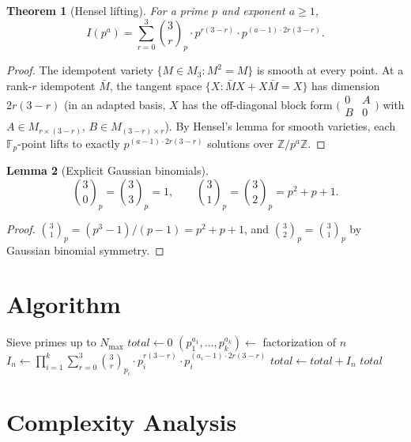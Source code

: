 \documentclass[12pt]{article}
\newtheorem{theorem}{Theorem}
\newtheorem{lemma}[theorem]{Lemma}
\begin{document}
\begin{theorem}[Hensel lifting]
For a prime $p$ and exponent $a \geq 1$,
\[
I(p^a) = \sum_{r=0}^{3} \binom{3}{r}_{\!p} \cdot p^{r(3-r)} \cdot p^{(a-1) \cdot 2r(3-r)}.
\]
\end{theorem}

\begin{proof}
The idempotent variety $\{M \in M_3 : M^2 = M\}$ is smooth at every point. At a rank-$r$ idempotent $\bar{M}$, the tangent space $\{X : \bar{M}X + X\bar{M} = X\}$ has dimension $2r(3-r)$ (in an adapted basis, $X$ has the off-diagonal block form $\bigl(\begin{smallmatrix} 0 & A \\ B & 0 \end{smallmatrix}\bigr)$ with $A \in M_{r \times (3-r)}$, $B \in M_{(3-r) \times r}$). By Hensel's lemma for smooth varieties, each $\mathbb{F}_p$-point lifts to exactly $p^{(a-1) \cdot 2r(3-r)}$ solutions over $\mathbb{Z}/p^a\mathbb{Z}$.
\end{proof}

\begin{lemma}[Explicit Gaussian binomials]
\[
\binom{3}{0}_{\!p} = \binom{3}{3}_{\!p} = 1, \qquad \binom{3}{1}_{\!p} = \binom{3}{2}_{\!p} = p^2 + p + 1.
\]
\end{lemma}

\begin{proof}
$\binom{3}{1}_p = (p^3 - 1)/(p - 1) = p^2 + p + 1$, and $\binom{3}{2}_p = \binom{3}{1}_p$ by Gaussian binomial symmetry.
\end{proof}

\section{Algorithm}

\begin{algorithmic}[1]
    \State Sieve primes up to $N_{\max}$
    \State $\textit{total} \gets 0$
        \State $(p_1^{a_1}, \ldots, p_k^{a_k}) \gets$ factorization of $n$
        \State $I_n \gets \prod_{i=1}^{k} \sum_{r=0}^{3} \binom{3}{r}_{p_i} \cdot p_i^{r(3-r)} \cdot p_i^{(a_i - 1) \cdot 2r(3-r)}$
        \State $\textit{total} \gets \textit{total} + I_n$
    \EndFor
    \State \Return $\textit{total}$
\EndFunction
\end{algorithmic}

\section{Complexity Analysis}
\end{document}
